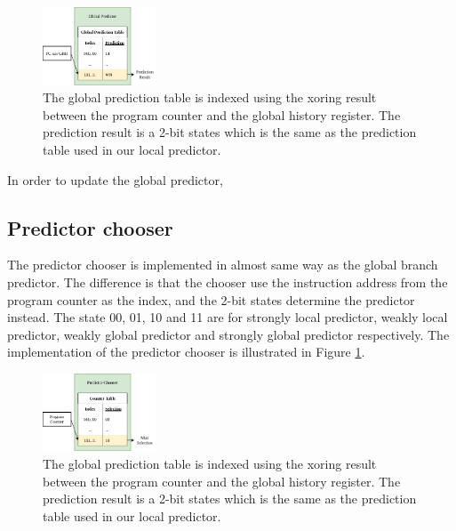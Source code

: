 \documentclass[conference]{IEEEtran}
\begin{document}
\begin{figure}[h]
    \centering
    \includegraphics[width=0.3\textwidth]{imgs/global_predictor}
    \caption{The global prediction table is indexed using the xoring result between the program counter and
    the global history register. The prediction result is a 2-bit states which is the same as the prediction
    table used in our local predictor.}
    \label{fig:global_predictor}
\end{figure}

In order to update the global predictor,

\subsection{Predictor chooser}

The predictor chooser is implemented in almost same way as the global branch predictor. The difference is that the chooser
use the instruction address from the program counter as the index, and the 2-bit states determine the
predictor instead. The state 00, 01, 10 and 11 are for strongly local predictor, weakly local predictor,
weakly global predictor and strongly global predictor respectively. The implementation of the predictor chooser
is illustrated in Figure \ref{fig:global_predictor}.

\begin{figure}[h]
    \centering
    \includegraphics[width=0.3\textwidth]{imgs/predictor_chooser}
    \caption{The global prediction table is indexed using the xoring result between the program counter and
    the global history register. The prediction result is a 2-bit states which is the same as the prediction
    table used in our local predictor.}
    \label{fig:predictor_chooser}
\end{figure}
\end{document}
